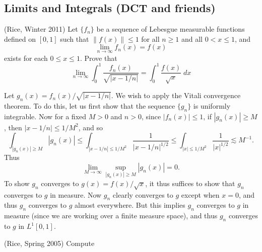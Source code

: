 \documentclass[answers]{exam}
\theoremstyle{problemstyle}
\newcommand{\1}[1]{\textbf{1}_{\left[#1\right]}} %
\begin{document}
\begin{questions}
\subsection{Limits and Integrals (DCT and friends)}

\question (Rice, Winter 2011) Let $\{ f_n \}$ be a sequence of Lebesgue measurable functions defined on $[0,1]$ such that $\| f(x) \| \leq 1$ for all $n \geq 1$ and all $0 < x \leq 1$, and
\[ \lim_{n \to \infty} f_n(x) = f(x) \]
%
exists for each $0 \leq x \leq 1$. Prove that
%
\[ \lim_{n \to \infty} \int_0^1 \frac{f_n(x)}{\sqrt{|x-1/n|}} = \int_0^1 \frac{f(x)}{\sqrt{x}}\; dx \]
\begin{solution}
    Let $g_n(x) = f_n(x) / \sqrt{|x - 1/n|}$. We wish to apply the Vitali convergence theorem. To do this, let us first show that the sequence $\{ g_n \}$ is uniformly integrable. Now for a fixed $M > 0$ and $n > 0$, since $|f_n(x)| \leq 1$, if $|g_n(x)| \geq M$, then $|x- 1/n| \leq 1/M^2$, and so
    \[ \int_{|g_n(x)| \geq M} |g_n(x)| \leq \int_{|x - 1/n| \leq 1/M^2} \frac{1}{|x - 1/n|^{1/2}} \leq \int_{|x| \leq 1/M^2} \frac{1}{|x|^{1/2}} \lesssim M^{-1}. \]
    Thus
    \[ \lim_{M \to \infty} \sup_{|g_n(x)| \geq M} |g_n(x)| = 0. \]
    To show $g_n$ converges to $g(x) = f(x) / \sqrt{x}$, it thus suffices to show that $g_n$ converges to $g$ in measure. Now $g_n$ clearly converges to $g$ except when $x = 0$, and thus $g_n$ converges to $g$ almost everywhere. But this implies $g_n$ converges to $g$ in measure (since we are working over a finite measure space), and thus $g_n$ converges to $g$ in $L^1[0,1]$.
\end{solution}

\question (Rice, Spring 2005) Compute
%
\end{questions}
\end{document}
